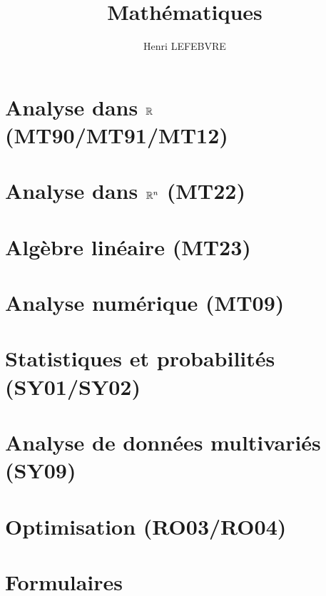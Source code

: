 \documentclass[10pt]{report}
\title{Mathématiques}
\author{Henri LEFEBVRE}
\begin{document}
    \maketitle
    \tableofcontents
    
    \chapter{Analyse dans $\mathbb{R}$ \small{(MT90/MT91/MT12)}}
    

    \chapter{Analyse dans $\mathbb{R}^n$ \small{(MT22)}}
    

    \chapter{Algèbre linéaire \small{(MT23)}}
    

    \chapter{Analyse numérique \small{(MT09)}}
    

    \chapter{Statistiques et probabilités \small{(SY01/SY02)}}
    

    \chapter{Analyse de données multivariés \small{(SY09)}}

    \chapter{Optimisation \small{(RO03/RO04)}}
    

    \chapter{Formulaires}
    
\end{document}
